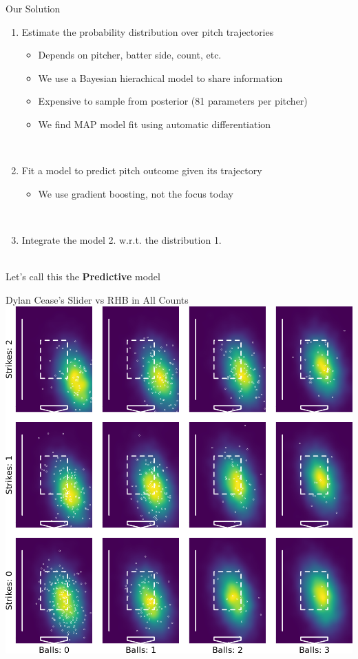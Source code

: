 \documentclass{beamer}
\begin{document}
  \begin{frame}{Our Solution}
    \begin{enumerate}
      \item Estimate the probability distribution over pitch trajectories
      \begin{itemize}
        \item Depends on pitcher, batter side, count, etc.
        \item We use a Bayesian hierachical model to share information
        \item Expensive to sample from posterior (81 parameters per pitcher)
        \item We find MAP model fit using automatic differentiation
      \end{itemize}
      ~\\
      \item Fit a model to predict pitch outcome given its trajectory
      \begin{itemize}
        \item We use gradient boosting, not the focus today
      \end{itemize}
      ~\\
      \item Integrate the model {\color{riceblue} 2.} w.r.t. the distribution {\color{riceblue} 1.}
    \end{enumerate}
    ~\\
    Let's call this the {\bf Predictive} model
  \end{frame}

  \begin{frame}{Dylan Cease's Slider vs RHB in All Counts}
    \vfill
    \centering
    \includegraphics[height = 0.85\textheight]{images/656302_SL_R_plate.png}
  \end{frame}
\end{document}
